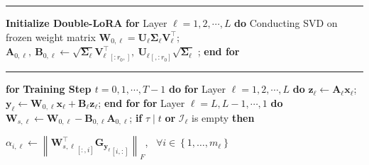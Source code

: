 \begin{algorithm}[t]
\caption{\celora}\label{alg:CeLoRA}
\footnotesize
\begin{algorithmic}[1]


\Statex\rule{\linewidth}{0.4pt}
\Statex \textbf{Initialize Double-LoRA}
    \State \quad \textbf{for} Layer $\ell=1,2,\cdots,L$ \textbf{do}
    \State \qquad Conducting SVD on frozen weight matrix
    \Statex \qquad $\mathbf{W}_{0,\ell}=\mathbf{U}_\ell\mathbf{\Sigma}_\ell \mathbf{V}_\ell^\top$;
    \State \qquad $\mathbf{A}_{0,\ell},\ \mathbf{B}_{0,\ell} \gets \sqrt{\mathbf{\Sigma}_\ell}{\mathbf{V}_\ell^\top}_{[:r_0,]},\ {\mathbf{U}_{\ell}}_{[,:r_0]}\sqrt{\mathbf{\Sigma}_\ell}$ ;
    \State \quad \textbf{end for}
\Statex \rule{\linewidth}{0.4pt}

\State \textbf{for} {\textbf{\celora Training Step $t=0,1,\cdots,T-1$}} \textbf{do}
\vspace{0.5mm}
    \State \quad \textbf{for} Layer $\ell=1,2,\cdots,L$ \textbf{do}
        \State \quad\quad $\mathbf{z}_\ell\gets\mathbf{A}_\ell\mathbf{x}_\ell$;
        \State \quad\quad $\mathbf{y}_\ell \gets \mathbf{W}_{0,\ell}\mathbf{x}_\ell+\mathbf{B}_\ell\mathbf{z}_\ell$;
    \State\quad\textbf{end for}
\vspace{0.5mm}
    \State \quad \textbf{for} Layer $\ell=L,L-1,\cdots,1$ \textbf{do}
        \State \quad\quad  $\mathbf{W}_{s,\ell} \gets \mathbf{W}_{0,\ell} - \mathbf{B}_{0,\ell}\mathbf{A}_{0,\ell}$;
        \State \quad\quad \textbf{if} {$\tau\mid t$ \textbf{or} $\mathcal{I}_\ell$ is empty} \textbf{then}
            
            \State \quad\qquad $\alpha_{i,\ell} \gets\left\|{\mathbf{W}_{s,\ell}^\top}_{[:,i]} {\mathbf{G_{y_\ell}}}_{[i,:]}\right\|_F$, \ $\forall i \in \left\{1,\dots,m_\ell\right\}$
            \State \quad{}
            

\end{algorithmic}
\end{algorithm}

